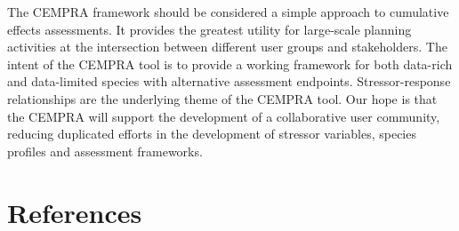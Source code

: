 \documentclass[
  letterpaper,
  DIV=11,
  numbers=noendperiod]{scrreprt}
\begin{document}
The CEMPRA framework should be considered a simple approach to
cumulative effects assessments. It provides the greatest utility for
large-scale planning activities at the intersection between different
user groups and stakeholders. The intent of the CEMPRA tool is to
provide a working framework for both data-rich and data-limited species
with alternative assessment endpoints. Stressor-response relationships
are the underlying theme of the CEMPRA tool. Our hope is that the CEMPRA
will support the development of a collaborative user community, reducing
duplicated efforts in the development of stressor variables, species
profiles and assessment frameworks.


\chapter*{References}\label{references}

\end{document}
